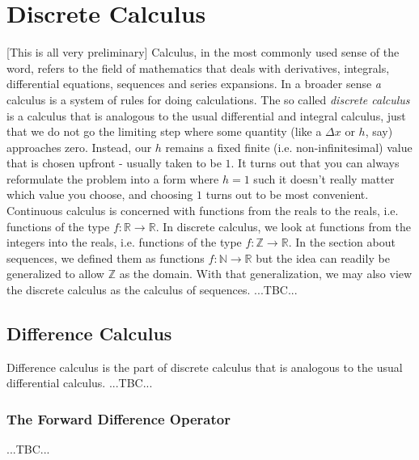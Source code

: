 \chapter{Discrete Calculus}
[This is all very preliminary] Calculus, in the most commonly used sense of the word, refers to the field of mathematics that deals with derivatives, integrals, differential equations, sequences and series expansions. In a broader sense \emph{a} calculus is a system of rules for doing calculations. The so called \emph{discrete calculus} is a calculus that is analogous to the usual differential and integral calculus, just that we do not go the limiting step where some quantity (like a $\Delta x$ or $h$, say) approaches zero. Instead, our $h$ remains a fixed finite (i.e. non-infinitesimal) value that is chosen upfront - usually taken to be $1$. It turns out that you can always reformulate the problem into a form where $h = 1$ such it doesn't really matter which value you choose, and choosing $1$ turns out to be most convenient. Continuous calculus is concerned with functions from the reals to the reals, i.e. functions of the type $f: \mathbb{R} \rightarrow \mathbb{R}$. In discrete calculus, we look at functions from the integers into the reals, i.e. functions of the type $f: \mathbb{Z} \rightarrow \mathbb{R}$. In the section about sequences, we defined them as functions $f: \mathbb{N} \rightarrow \mathbb{R}$ but the idea can readily be generalized to allow $\mathbb{Z}$ as the domain. With that generalization, we may also view the discrete calculus as the calculus of sequences. ...TBC...




\section{Difference Calculus}
Difference calculus is the part of discrete calculus that is analogous to the usual differential calculus. ...TBC...


\subsection{The Forward Difference Operator}  ...TBC...

